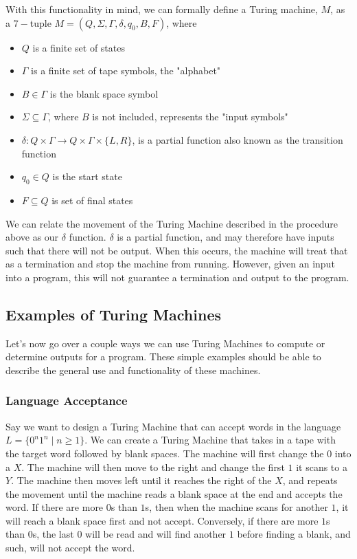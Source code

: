 \documentclass[12pt]{article}
\begin{document}
\noindent With this functionality in mind, we can formally define a Turing machine, $M$, as a $7-$tuple $M=(Q,\Sigma, \Gamma, \delta, q_0, B, F)$, where


\begin{itemize}

\item $Q$ is a finite set of states
\item $\Gamma$ is a finite set of tape symbols, the "alphabet"
\item $B \in \Gamma$ is the blank space symbol
\item $\Sigma \subseteq \Gamma$, where $B$ is not included, represents the "input symbols"
\item $\delta : Q \times \Gamma \to Q \times \Gamma \times \{L,R\}$, is a partial function also known as the transition function
\item $q_0 \in Q$ is the start state
\item $F \subseteq Q$ is set of final states

\end{itemize}

We can relate the movement of the Turing Machine described in the procedure above as our $\delta$ function. $\delta$ is a partial function, and may therefore have inputs such that there will not be output. When this occurs, the machine will treat that as a termination and stop the machine from running. However, given an input into a program, this will not guarantee a termination and output to the program.

\subsection{Examples of Turing Machines}

Let's now go over a couple ways we can use Turing Machines to compute or determine outputs for a program. These simple examples should be able to describe the general use and functionality of these machines.
\subsubsection*{Language Acceptance}

Say we want to design a Turing Machine that can accept words in the language $L = \{0^n1^n \mid n \geq 1 \}$. We can create a Turing Machine that takes in a tape with the target word followed by blank spaces. The machine will first change the $0$ into a $X$. The machine will then move to the right and change the first $1$ it scans to a $Y$. The machine then moves left until it reaches the right of the $X$, and repeats the movement until the machine reads a blank space at the end and accepts the word. If there are more $0$s than $1$s, then when the machine scans for another $1$, it will reach a blank space first and not accept. Conversely, if there are more $1$s than $0$s, the last $0$ will be read and will find another $1$ before finding a blank, and such, will not accept the word.
\end{document}
